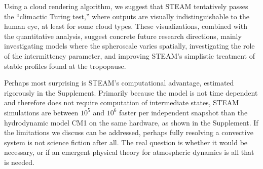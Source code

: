 \documentclass[acp, manuscript, english]{copernicus}
\begin{document}
Using a cloud rendering algorithm, we suggest that STEAM tentatively passes the ``climactic Turing test,'' where outputs are visually indistinguishable to the human eye, at least for some cloud types. These visualizations, combined with the quantitative analysis, suggest concrete future research directions, mainly investigating models where the spheroscale varies spatially, investigating the role of the intermittency parameter, and improving STEAM's simplistic treatment of stable profiles found at the tropopause.

Perhaps most surprising is STEAM's computational advantage, estimated rigorously in the Supplement. Primarily because the model is not time dependent and therefore does not require computation of intermediate states, STEAM simulations are between $10^5$ and $10^6$ faster per independent snapshot than the hydrodynamic model CM1 on the same hardware, as shown in the Supplement. If the limitations we discuss can be addressed, perhaps fully resolving a convective system is not science fiction after all. The real question is whether it would be necessary, or if an emergent physical theory for atmospheric dynamics is all that is needed.


\clearpage



































\end{document}
